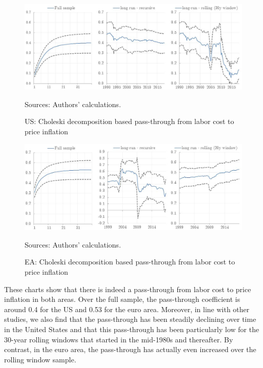 \documentclass[11pt]{article}
\begin{document}
\begin{figure}[!htbp]
\begin{center}
\caption{US: Choleski decomposition based pass-through from labor cost to price inflation}\label{fig:CholeskiIRF_US}
\includegraphics[scale = .7]{Chart_US_IRF_USEApaper.jpg}
\begin{minipage}{0.97\textwidth} {\footnotesize
Sources: Authors' calculations.\par}
\end{minipage}
\end{center}
\end{figure}


\begin{figure}[!htbp]
\begin{center}
\caption{EA: Choleski decomposition based pass-through from labor cost to price inflation}\label{fig:CholeskiIRF_EA}
\includegraphics[scale = .7]{Chart_EA_IRF_USEApaper.jpg}
\begin{minipage}{0.97\textwidth} {\footnotesize
Sources: Authors' calculations.\par}
\end{minipage}
\end{center}
\end{figure}

These charts show that there is indeed a pass-through from labor cost to price inflation in both areas. Over the full sample, the pass-through coefficient is around 0.4 for the US and 0.53 for the euro area. Moreover, in line with other studies, we also find that the pass-through has been steadily declining over time in the United States and that this pass-through has been particularly low for the 30-year rolling windows that started in the mid-1980s and thereafter. By contrast, in the euro area, the pass-through has actually even increased over the rolling window sample.
\end{document}
